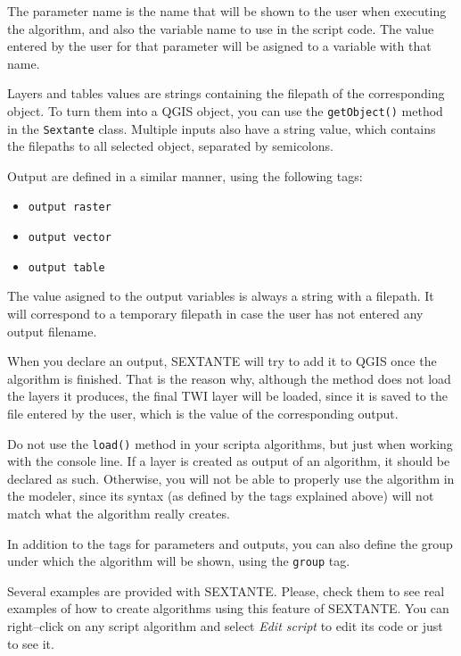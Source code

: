 The parameter name is the name that will be shown to the user when executing the algorithm, and also the variable name to use in the script code. The value entered by the user for that parameter will be asigned to a variable with that name.

Layers and tables values are strings containing the filepath of the corresponding object. To turn them into a QGIS object, you can use the \texttt{getObject()} method in the \texttt{Sextante} class. Multiple inputs also have a string value, which contains the filepaths to all selected object, separated by semicolons.

Output are defined in a similar manner, using the following tags:

\begin{itemize}
	\item \texttt{output raster}
	\item \texttt{output vector}
	\item \texttt{output table}
\end{itemize}

The value asigned to the output variables is always a string with a filepath. It will correspond to a temporary filepath in case the user has not entered any output filename.

When you declare an output, SEXTANTE will try to add it to QGIS once the algorithm is finished. That is the reason why, although the  method does not load the layers it produces, the final TWI layer will be loaded, since it is saved to the file entered by the user, which is the value of the corresponding output.

Do not use the \texttt{load()} method in your scripta algorithms, but just when working with the console line. If a layer is created as output of an algorithm, it should be declared as such. Otherwise, you will not be able to properly use the algorithm in the modeler, since its syntax (as defined by the tags explained above) will not match what the algorithm really creates.

In addition to the tags for parameters and outputs, you can also define the group under which the algorithm will be shown, using the \texttt{group} tag.

Several examples are provided with SEXTANTE. Please, check them to see real examples of how to create algorithms using this feature of SEXTANTE. You can right--click on any script algorithm and select \emph{Edit script} to edit its code or just to see it.